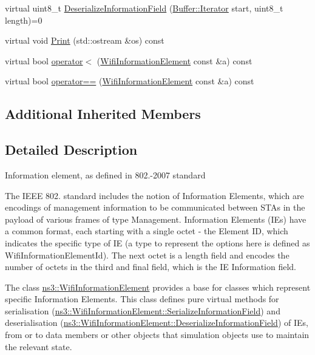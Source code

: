 \begin{DoxyCompactItemize}
virtual uint8\+\_\+t \hyperlink{classns3_1_1WifiInformationElement_a92135cae0f188d7d8f6c30d9f4becd82}{Deserialize\+Information\+Field} (\hyperlink{classns3_1_1Buffer_1_1Iterator}{Buffer\+::\+Iterator} start, uint8\+\_\+t length)=0
\item 
virtual void \hyperlink{classns3_1_1WifiInformationElement_ad1a37694015695eb75893884494eab6c}{Print} (std\+::ostream \&os) const 
\item 
virtual bool \hyperlink{classns3_1_1WifiInformationElement_a263c3d445dfaf0f11929cdb2cae93d2d}{operator$<$} (\hyperlink{classns3_1_1WifiInformationElement}{Wifi\+Information\+Element} const \&a) const 
\item 
virtual bool \hyperlink{classns3_1_1WifiInformationElement_ad57be4560fa6abb25e6b0745fd7213e0}{operator==} (\hyperlink{classns3_1_1WifiInformationElement}{Wifi\+Information\+Element} const \&a) const 
\end{DoxyCompactItemize}
\subsection*{Additional Inherited Members}


\subsection{Detailed Description}
Information element, as defined in 802.-\/2007 standard

The I\+E\+EE 802. standard includes the notion of Information Elements, which are encodings of management information to be communicated between S\+T\+As in the payload of various frames of type Management. Information Elements (I\+Es) have a common format, each starting with a single octet -\/ the Element ID, which indicates the specific type of IE (a type to represent the options here is defined as Wifi\+Information\+Element\+Id). The next octet is a length field and encodes the number of octets in the third and final field, which is the IE Information field. 

The class \hyperlink{classns3_1_1WifiInformationElement}{ns3\+::\+Wifi\+Information\+Element} provides a base for classes which represent specific Information Elements. This class defines pure virtual methods for serialisation (\hyperlink{classns3_1_1WifiInformationElement_aaa9fe963ad89df58b8980eb94ace2a7c}{ns3\+::\+Wifi\+Information\+Element\+::\+Serialize\+Information\+Field}) and deserialisation (\hyperlink{classns3_1_1WifiInformationElement_a92135cae0f188d7d8f6c30d9f4becd82}{ns3\+::\+Wifi\+Information\+Element\+::\+Deserialize\+Information\+Field}) of I\+Es, from or to data members or other objects that simulation objects use to maintain the relevant state.

